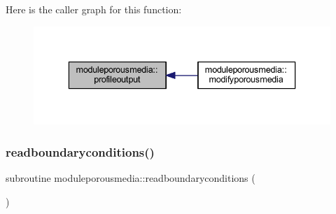 Here is the caller graph for this function\+:\nopagebreak
\begin{figure}[H]
\begin{center}
\leavevmode
\includegraphics[width=336pt]{namespacemoduleporousmedia_a929b6fbd1b7c5c387333ef5f2d508c18_icgraph}
\end{center}
\end{figure}
\mbox{\label{namespacemoduleporousmedia_afc9e4c782508e0d8b55b1c444d54d741}} 
\subsubsection{\texorpdfstring{readboundaryconditions()}{readboundaryconditions()}}
{\footnotesize\ttfamily subroutine moduleporousmedia\+::readboundaryconditions (\begin{DoxyParamCaption}{ }\end{DoxyParamCaption})\hspace{0.3cm}{\ttfamily [private]}}

